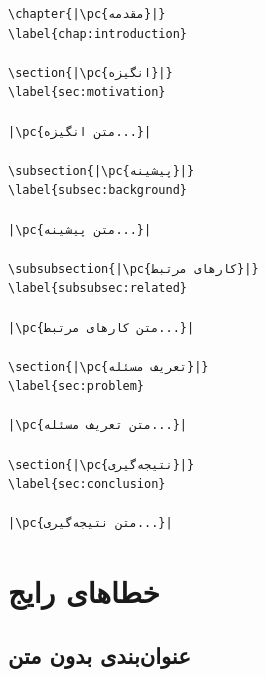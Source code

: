 \begin{latin}
\begin{verbatim}
\chapter{|\pc{مقدمه}|}
\label{chap:introduction}

\section{|\pc{انگیزه}|}
\label{sec:motivation}

|\pc{متن انگیزه...}|

\subsection{|\pc{پیشینه}|}
\label{subsec:background}

|\pc{متن پیشینه...}|

\subsubsection{|\pc{کارهای مرتبط}|}
\label{subsubsec:related}

|\pc{متن کارهای مرتبط...}|

\section{|\pc{تعریف مسئله}|}
\label{sec:problem}

|\pc{متن تعریف مسئله...}|

\section{|\pc{نتیجه‌گیری}|}
\label{sec:conclusion}

|\pc{متن نتیجه‌گیری...}|
\end{verbatim}
\end{latin}


\section{خطاهای رایج}
\label{sec:chapters-mistakes}

\subsection{عنوان‌بندی بدون متن}
\label{sec:chapters-mistake-empty}

